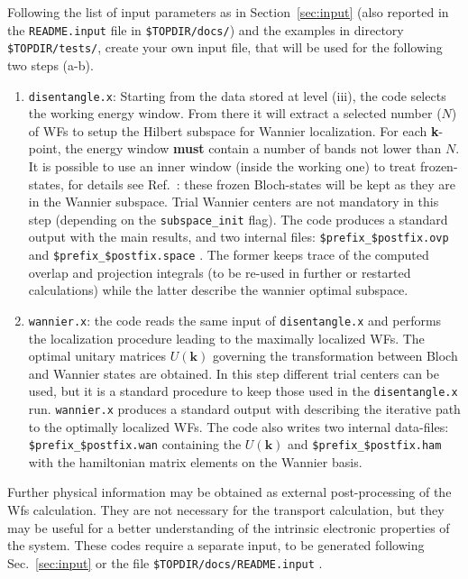 Following the list of input parameters as in
Section~\ref{sec:input} (also reported in the {\tt README.input} file
in {\tt \$TOPDIR/docs/}) and the examples in directory {\tt \$TOPDIR/tests/}, 
create your own input file, that will be used for the following two steps (a-b).
\renewcommand{\theenumi}{\alph{enumi}}
\renewcommand{\labelenumi}{\theenumi)}
%
%
\begin{enumerate}
\item {\tt disentangle.x}: Starting from the data stored at level (iii), 
      the code selects the working energy window. From there
      it will extract a selected number ($N$) of WFs to setup the 
      Hilbert subspace for Wannier localization.
      For each \textbf{k}-point, the energy window {\bf must}
      contain a number of bands not lower than $N$.
      It is possible to use an inner window (inside the working one) to
      treat frozen-states, for details see Ref.~\cite{ivo2}:
      these frozen Bloch-states will be kept as they are in the Wannier subspace.
      Trial Wannier centers are not mandatory in this step (depending
      on the {\tt subspace\_init} flag).
      The code produces a standard output with the main results,
      and two internal files: {\tt \$prefix\_\$postfix.ovp} and
      {\tt \$prefix\_\$postfix.space} . The former keeps trace of the 
      computed overlap and projection integrals (to be re-used in further 
      or restarted calculations) while the latter describe the wannier optimal 
      subspace.

\item {\tt wannier.x}: the code reads the same input of {\tt disentangle.x} and
      performs the localization
      procedure leading to the maximally localized WFs. 
      The optimal unitary matrices $U(\mathbf{k})$ governing the transformation between
      Bloch and Wannier states are obtained.
      In this step different trial centers can be used, but it is a standard procedure
      to keep those used in the {\tt disentangle.x} run.
      {\tt wannier.x} produces a standard output with describing the iterative
      path to the optimally localized WFs. 
      The code also writes two internal data-files: {\tt \$prefix\_\$postfix.wan}
      containing the $U(\mathbf{k})$ and {\tt \$prefix\_\$postfix.ham} with the 
      hamiltonian matrix elements on the Wannier basis.
\end{enumerate}
%
%

\noindent
Further physical information may be obtained as external
post-processing of the Wfs calculation. They are not necessary for
the transport calculation, but they may be useful for a
better understanding of the intrinsic electronic properties of the
system. These codes require a separate input, to be generated
following Sec.~\ref{sec:input} or the file
{\tt \$TOPDIR/docs/README.input} .

